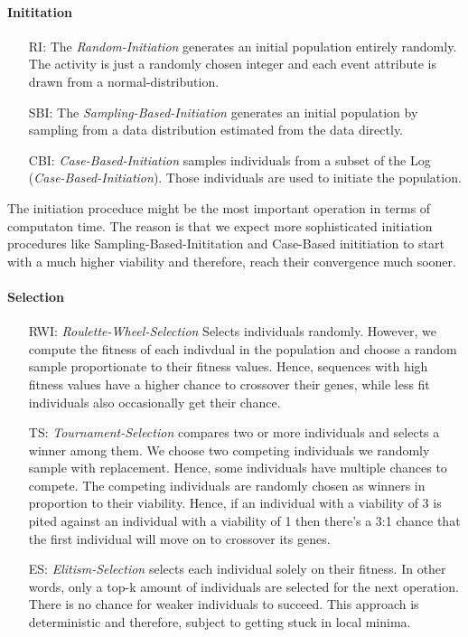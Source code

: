 \documentclass[./../../paper.tex]{subfiles}
\begin{document}
\paragraph{Inititation}
\begin{enumerate}
    \item[RI:] The \emph{Random-Initiation} generates an initial population entirely randomly. The activity is just a randomly chosen integer and each event attribute is drawn from a normal-distribution.
    \item[SBI:] The \emph{Sampling-Based-Initiation} generates an initial population by sampling from a data distribution estimated from the data directly.
    \item[CBI:] \emph{Case-Based-Initiation} samples individuals from a subset of the Log (\emph{Case-Based-Initiation}). Those individuals are used to initiate the population.
\end{enumerate}
The initiation proceduce might be the most important operation in terms of computaton time. The reason is that we expect more sophisticated initiation procedures like Sampling-Based-Inititation and Case-Based inititiation to start with a much higher viability and therefore, reach their convergence much sooner.


\paragraph{Selection}
\begin{enumerate}
    \item[RWI:] \emph{Roulette-Wheel-Selection} Selects individuals randomly. However, we compute the fitness of each indivdual in the population and choose a random sample proportionate to their fitness values. Hence, sequences with high fitness values have a higher chance to crossover their genes, while less fit individuals also occasionally get their chance.
    \item[TS:] \emph{Tournament-Selection} compares two or more individuals and selects a winner among them. We choose two competing individuals we randomly sample with replacement. Hence, some individuals have multiple chances to compete. The competing individuals are randomly chosen as winners in proportion to their viability. Hence, if an individual with a viability of 3 is pited against an individual with a viability of 1 then there's a 3:1 chance that the first individual will move on to crossover its genes.
    \item[ES:] \emph{Elitism-Selection} selects each individual solely on their fitness. In other words, only a top-k amount of individuals are selected for the next operation. There is no chance for weaker individuals to succeed. This approach is deterministic and therefore, subject to getting stuck in local minima.
\end{enumerate}
\end{document}
